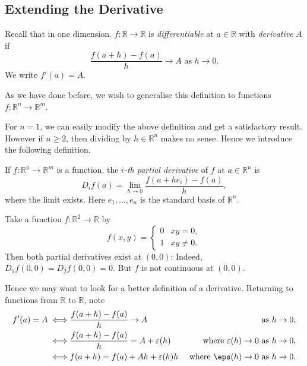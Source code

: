 \documentclass[12pt]{article}
\begin{document}
\subsection{Extending the Derivative}
\label{sub:extending_the_derivative}

Recall that in one dimension. $f : \mathbb{R} \to \mathbb{R}$ is \textit{differentiable} at $a \in \mathbb{R}$ with \textit{derivative} $A$ if
\[
	\frac{f(a+h) - f(a)}{h} \to A \text{ as } h \to 0
.\]
We write $f'(a) = A$.

As we have done before, we wish to generalise this definition to functions $f : \mathbb{R}^{n} \to \mathbb{R}^{m}$.

For $n = 1$, we can easily modify the above definition and get a satisfactory result. However if $n \geq 2$, then dividing by $h \in \mathbb{R}^{n}$ makes no sense. Hence we introduce the following definition.

\begin{definition}
	If $f : \mathbb{R}^{n} \to \mathbb{R}^{m}$ is a function, the $i$\textit{-th partial derivative} of $f$ at $a \in \mathbb{R}^{n}$ is
	\[
		D_{i}f(a) = \lim_{h \to 0} \frac{f(a + h e_i) - f(a)}{h}
	,\]
	where the limit exists. Here $e_1, \ldots, e_n$ is the standard basis of $\mathbb{R}^{n}$.
\end{definition}

\begin{exbox}
	Take a function $f : \mathbb{R}^2 \to \mathbb{R}$ by
	\[
		f(x, y) =
		\begin{cases}
			0 & xy = 0, \\
			1 & xy \neq 0.
		\end{cases}
	\]
	Then both partial derivatives exist at $(0, 0)$: Indeed, $D_1f(0, 0) = D_2f(0, 0) = 0$. But $f$ is not continuous at $(0, 0)$.
\end{exbox}

Hence we may want to look for a better definition of a derivative. Returning to functions from $\mathbb{R}$ to $\mathbb{R}$, note
\begin{align*}
	f'(a) = A \iff& \frac{f(a+h) - f(a)}{h} \to A & \text{ as } h &\to 0, \\
		\iff& \frac{f(a+h) - f(a)}{h} = A + \varepsilon(h) & \text{ where } \varepsilon(h) \to 0 \text{ as } h &\to 0, \\
			\iff& f(a+h) = f(a) + Ah + \varepsilon(h)h & \text{ where } \eps(h) \to 0 \text{ as } h &\to 0.
\end{align*}
\end{document}
